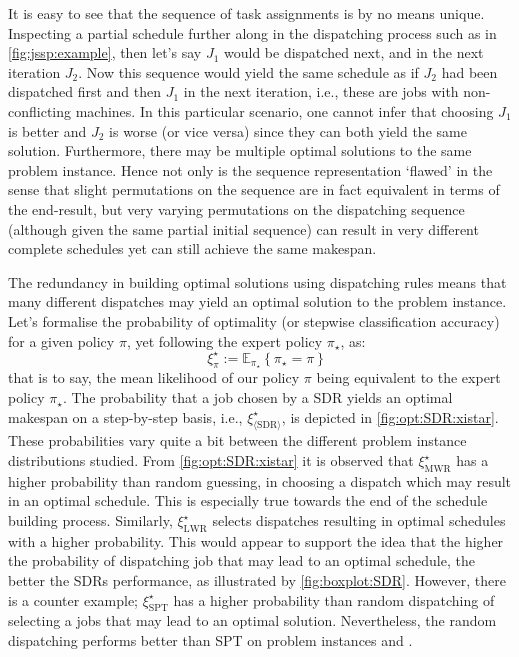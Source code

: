 \documentclass[twocolumn]{svjour3}
\begin{document}
It is easy to see that the sequence of task assignments is by no means unique. 
Inspecting a partial schedule further along in the dispatching process such as 
in \cref{fig:jssp:example}, then let's say $J_1$ would be dispatched next, and 
in the next iteration $J_2$. Now this sequence would yield the same schedule as 
if $J_2$ had been dispatched first and then $J_1$ in the next iteration, 
i.e., these are jobs with non-conflicting machines. 
In this particular scenario, one cannot infer that choosing $J_1$ is better 
and $J_2$ is worse (or vice versa) since they can both yield the same solution.
Furthermore, 
there may be multiple optimal solutions to the same 
problem instance. Hence not only is the sequence representation `flawed' in the 
sense that slight permutations on the sequence are in fact equivalent in terms 
of the end-result, but very varying permutations on the dispatching sequence 
(although given the same partial initial sequence) can result in very different 
complete schedules yet can still achieve the same makespan. 

The redundancy in building optimal solutions using dispatching rules means that 
many different dispatches may yield an optimal solution to the problem instance.
Let's formalise the probability of optimality (or stepwise 
classification accuracy) for a given policy $\pi$, yet following the expert 
policy $\pi_\star$, as:
\begin{equation}\quad \label{eq:tracc:opt}
\xi^\star_{\pi} := \mathbb{E}_{\pi_\star}\left\{\pi_{\star} = \pi \right\}
\end{equation}
that is to say, the mean likelihood of our policy $\pi$ being equivalent to the 
expert policy $\pi_\star$.
The probability that a job chosen by a SDR yields an optimal makespan on a 
step-by-step basis, i.e., $\xi^\star_{\langle \text{SDR} \rangle}$, is depicted 
in \cref{fig:opt:SDR:xistar}. These probabilities
vary quite a bit between the different problem instance distributions studied. 
From \cref{fig:opt:SDR:xistar} it is observed that $\xi^\star_{\text{MWR}}$ has 
a higher probability than random guessing, in choosing a dispatch which may 
result in an optimal schedule. This is especially true towards the end of the 
schedule building process. 
Similarly, $\xi^\star_{\text{LWR}}$ selects dispatches 
resulting in optimal schedules with a higher probability. This would appear to 
support the idea that the higher the probability of dispatching job that 
may lead to an optimal schedule, the better the SDRs performance, as 
illustrated by \cref{fig:boxplot:SDR}. However, there is a counter example; 
$\xi^\star_{\text{SPT}}$ has a higher probability than random dispatching of 
selecting a jobs that may lead to an optimal solution. Nevertheless, the random 
dispatching performs better than SPT on problem instances  and 
. 
\end{document}
